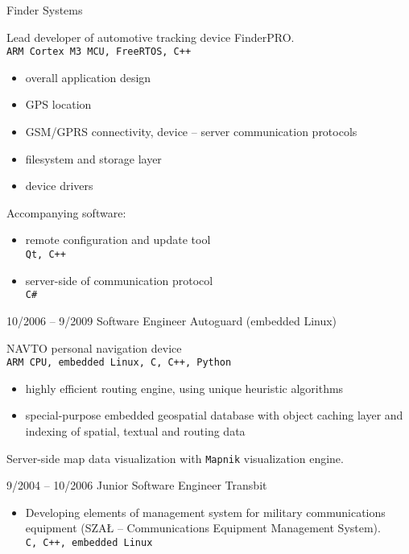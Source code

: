 \documentclass[8pt]{developercv} %
\begin{document}
\begin{entrylist}
		{Finder Systems}
		{Lead developer of automotive tracking device FinderPRO.\\
                  \texttt{ARM Cortex M3 MCU, FreeRTOS, C++}
                  \begin{itemize}
                    \item overall application design
                    \item GPS location
                    \item GSM/GPRS connectivity, device -- server communication
                      protocols
                    \item filesystem and storage layer
                    \item device drivers
                  \end{itemize}
                  Accompanying software:
                  \begin{itemize}
                    \item remote configuration and update tool\\
                      \texttt{Qt, C++}
                    \item server-side of communication protocol\\
                      \texttt{C\#}
                  \end{itemize}
                }
        \entry
		{10/2006 -- 9/2009}
		{Software Engineer}
		{Autoguard (embedded Linux)}
		{NAVTO personal navigation device\\
                  \texttt{ARM CPU, embedded Linux, C, C++, Python}\\
                  \begin{itemize}
                    \item highly efficient routing engine,
                      using unique heuristic algorithms
                    \item special-purpose embedded geospatial database
                      with object caching layer and indexing of
                      spatial, textual and routing data
                  \end{itemize}
                  Server-side map data visualization with \texttt{Mapnik}
                  visualization engine.
                }
        \entry
		{9/2004 -- 10/2006}
		{Junior Software Engineer}
		{Transbit}
		{\begin{itemize}
                    \item Developing elements of management system for military
                      communications equipment (SZAŁ -- Communications Equipment
                      Management System).\\
                      \texttt{C, C++, embedded Linux}
                  \end{itemize}
                }
\end{entrylist}
\end{document}
